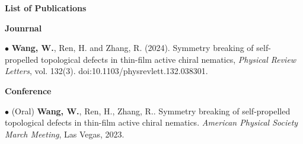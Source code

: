 \begin{center}
	{\LARGE\bf List of Publications}
\end{center}

{\Large{\bf{Jounrnal}}}

$\bullet$	{\bf Wang, W.}, Ren, H. and Zhang, R. (2024). Symmetry breaking of self-propelled topological defects in thin-film active chiral nematics, \emph{Physical Review Letters}, vol. 132(3). doi:10.1103/physrevlett.132.038301. 

\null\vspace{0.5in}
{\Large{\bf{Conference}}}

$\bullet$   (Oral) {\bf{Wang, W.}}, Ren, H., Zhang, R.. Symmetry breaking of self-propelled topological defects in thin-film active chiral nematics. \emph{American Physical Society March Meeting}, Las Vegas, 2023.


